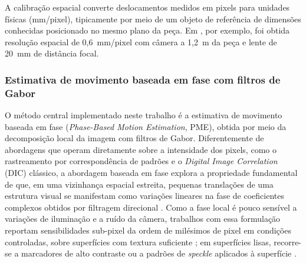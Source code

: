 \documentclass[a4paper,10pt,twocolumn]{article}
\begin{document}
A calibração espacial converte deslocamentos medidos em pixels para unidades físicas (mm/pixel), tipicamente por meio de um objeto de referência de dimensões conhecidas posicionado no mesmo plano da peça. Em \cite{robotcamera2025}, por exemplo, foi obtida resolução espacial de 0,6~mm/pixel com câmera a 1,2~m da peça e lente de 20~mm de distância focal.

\subsubsection{Estimativa de movimento baseada em fase com filtros de Gabor}

O método central implementado neste trabalho é a estimativa de movimento baseada em fase (\textit{Phase-Based Motion Estimation}, PME), obtida por meio da decomposição local da imagem com filtros de Gabor. Diferentemente de abordagens que operam diretamente sobre a intensidade dos pixels, como o rastreamento por correspondência de padrões e o \textit{Digital Image Correlation} (DIC) clássico, a abordagem baseada em fase explora a propriedade fundamental de que, em uma vizinhança espacial estreita, pequenas translações de uma estrutura visual se manifestam como variações lineares na fase de coeficientes complexos obtidos por filtragem direcional \cite{Wadhwa2013, Phase2022}. Como a fase local é pouco sensível a variações de iluminação e a ruído da câmera, trabalhos com essa formulação reportam sensibilidades sub-pixel da ordem de milésimos de pixel em condições controladas, sobre superfícies com textura suficiente \cite{ZhangLogGabor2024, WangLogGabor2022}; em superfícies lisas, recorre-se a marcadores de alto contraste ou a padrões de \textit{speckle} aplicados à superfície \cite{robotcamera2025, Mhatre2026}.
\end{document}
